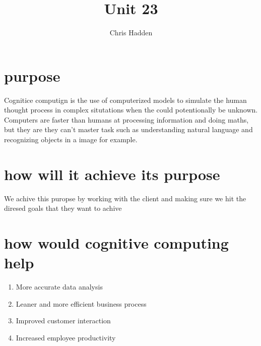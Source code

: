\documentclass{article}
\title{Unit 23}
\author{Chris Hadden}
\date{}
\begin{document}
\maketitle


\section{purpose}
Cognitice computign is the use of computerized models to simulate the human thought process in complex situtations when the could potentionally be unknown. Computers are faster than humans at processing information and doing maths, but they are they can't master task such as understanding natural language and recognizing objects in a image for example. 


\section{how will it achieve its purpose}
We achive this puropse by working with the client and making sure we hit the diresed goals that they want to achive

\section{how would cognitive computing help}
\begin{enumerate}
	\item More accurate data  analysis
	\item Leaner and more efficient business process
	\item Improved customer interaction
	\item Increased employee productivity
\end{enumerate}
\end{document}
